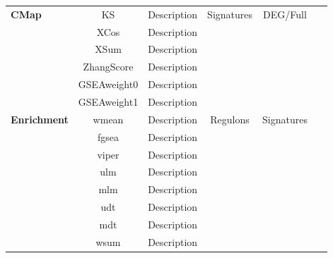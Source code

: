 \begin{xltabular}{\textwidth}{Xccccc}
\midrule
\textbf{CMap}       & KS             & Description & Signatures   & DEG/Full     & ~\cite{cmap} \\
                & XCos           & Description &              &              & ~\cite{cmap} \\
                & XSum           & Description &              &              & ~\cite{cmap} \\
                & ZhangScore     & Description &              &              & ~\cite{cmap} \\
                & GSEAweight0    & Description &              &              & ~\cite{cmap} \\
                & GSEAweight1    & Description &              &              & ~\cite{cmap} \\
\midrule
\textbf{Enrichment} & wmean   & Description  & Regulons     & Signatures  & ~\cite{cbdd} \\
                & fgsea   & Description  &              &             & ~\cite{fgsea} \\
                & viper   & Description  &              &             & ~\cite{viper} \\
                & ulm     & Description  &              &             & ~\cite{cbdd} \\
                & mlm     & Description  &              &             & ~\cite{cbdd} \\
                & udt     & Description  &              &             & ~\cite{cbdd} \\
                & mdt     & Description  &              &             & ~\cite{cbdd} \\
                & wsum    & Description  &              &             & ~\cite{fgsea} \\
\bottomrule
\end{xltabular}
\egroup


